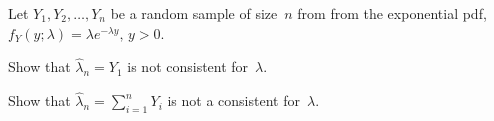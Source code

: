 \begin{problem}
  Let ${Y_1,Y_2,\ldots,Y_n}$ be a random sample of size~$n$ from from the exponential pdf, ${f_Y(y;\lambda) = \lambda e^{-\lambda y} \text{, } y > 0}$.
\end{problem}

\begin{subproblem}
  Show that ${\hat{\lambda}_n = Y_1}$ is not consistent for~$\lambda$.
\end{subproblem}

\begin{subproblem}
  Show that ${\hat{\lambda}_n = \sum_{i=1}^{n} Y_i}$ is not a consistent for~$\lambda$.
\end{subproblem}
